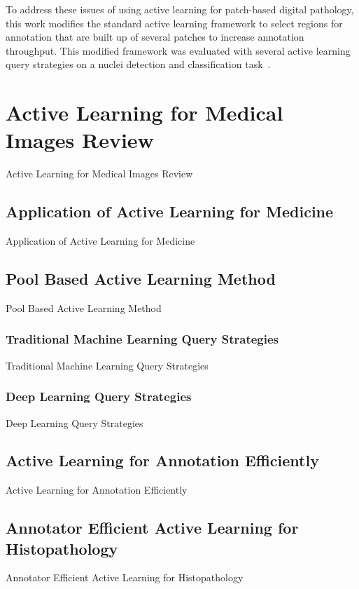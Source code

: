 To address these issues of using active learning for patch-based digital pathology, this work modifies the standard active learning framework to select regions for annotation that are built up of several patches to increase annotation throughput. This modified framework was evaluated with several active learning query strategies on a nuclei detection and classification task~\citep{sirinukunwattana2016locality}.



\section{Active Learning for Medical Images Review}
\label{sec:active_review}
Active Learning for Medical Images Review

\subsection{Application of Active Learning for Medicine}
\label{subsec:active_applications}
Application of Active Learning for Medicine

\subsection{Pool Based Active Learning Method}
\label{subsec:active_pool_based}
Pool Based Active Learning Method 

\subsubsection{Traditional Machine Learning Query Strategies}
Traditional Machine Learning Query Strategies

\subsubsection{Deep Learning Query Strategies}
Deep Learning Query Strategies

\subsection{Active Learning for Annotation Efficiently}
\label{subsec:active_annotation_efficiently}
Active Learning for Annotation Efficiently

\subsection{Annotator Efficient Active Learning for Histopathology}
\label{subsec:active_annotator_efficient_histopathology}
Annotator Efficient Active Learning for Histopathology



